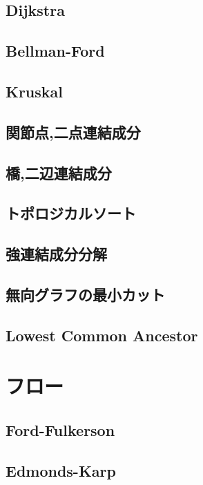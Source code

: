 \documentclass[landscape,twocolumn,9pt]{jsarticle}
\begin{document}

\subsection{Dijkstra}

\subsection{Bellman-Ford}

\subsection{Kruskal}

\subsection{関節点,二点連結成分}

\subsection{橋,二辺連結成分}

\subsection{トポロジカルソート}

\subsection{強連結成分分解}

\subsection{無向グラフの最小カット}

\subsection{Lowest Common Ancestor}


\section{フロー}

\subsection{Ford-Fulkerson}

\subsection{Edmonds-Karp}

\end{document}
